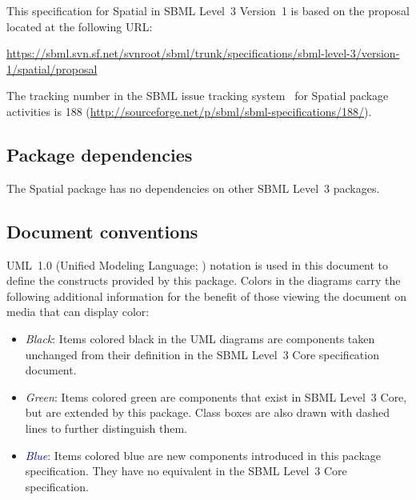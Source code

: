 This specification for Spatial in SBML Level~3 Version~1 is based on the proposal located at the following URL:

\begin{center}
  \vspace*{1ex}\small
  \url{https://sbml.svn.sf.net/svnroot/sbml/trunk/specifications/sbml-level-3/version-1/spatial/proposal}
  \vspace*{1ex}
\end{center}

The tracking number in the SBML issue tracking system~\citep{tracker} for Spatial package activities is 188 (\url{http://sourceforge.net/p/sbml/sbml-specifications/188/}).


\subsection{Package dependencies}

The Spatial package has no dependencies on other SBML Level~3 packages.


\subsection{Document conventions}
\label{conventions}

UML~1.0 (Unified Modeling Language; \citealt{eriksson:1998, oestereich:1999}) notation is used in this document to define the constructs provided by this package.  Colors in the diagrams carry the following additional information for the benefit of those viewing the document on media that can display color:

\begin{itemize}

\item[\raisebox{2.75pt}{\colorbox{black}{\rule{0.8pt}{0.8pt}}}]
  \emph{Black}: Items colored black in the UML diagrams are components
  taken unchanged from their definition in the SBML Level~3 Core
  specification document.

\item[\raisebox{2.75pt}{\colorbox{mediumgreen}{\rule{0.8pt}{0.8pt}}}]
  \emph{\textcolor{mediumgreen}{Green}}: Items colored green are
  components that exist in SBML Level~3 Core, but are extended by this
  package.  Class boxes are also drawn with dashed lines to further
  distinguish them.

\item[\raisebox{2.75pt}{\colorbox{darkblue}{\rule{0.8pt}{0.8pt}}}]
  \emph{\textcolor{darkblue}{Blue}}: Items colored blue are new
  components introduced in this package specification.  They have no
  equivalent in the SBML Level~3 Core specification.

\end{itemize}


